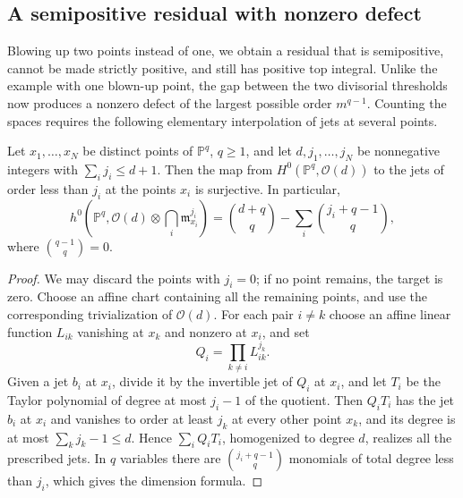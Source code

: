\subsection{A semipositive residual with nonzero defect}
\label{sec:two-point-fiber-integrability}

Blowing up two points instead of one, we obtain a residual that is semipositive, cannot be made strictly positive, and still has positive top integral. Unlike the example with one blown-up point, the gap between the two divisorial thresholds now produces a nonzero defect of the largest possible order $m^{q-1}$. Counting the spaces requires the following elementary interpolation of jets at several points.

\begin{lemma}\label{lem:finite-point-jet-interpolation}
Let $x_1,\ldots,x_N$ be distinct points of $\mathbb P^q$, $q\geq1$, and let $d,j_1,\ldots,j_N$ be nonnegative integers with $\sum_i j_i\leq d+1$. Then the map from $H^0(\mathbb P^q,\mathcal O(d))$ to the jets of order less than $j_i$ at the points $x_i$ is surjective. In particular,
\[
 h^0\left(\mathbb P^q,\mathcal O(d)\otimes\bigcap_i\mathfrak m_{x_i}^{j_i}\right)
 =\binom{d+q}{q}-\sum_i\binom{j_i+q-1}{q},
\]
where $\binom{q-1}{q}=0$.
\end{lemma}
\begin{proof}
We may discard the points with $j_i=0$; if no point remains, the target is zero. Choose an affine chart containing all the remaining points, and use the corresponding trivialization of $\mathcal O(d)$. For each pair $i\ne k$ choose an affine linear function $L_{ik}$ vanishing at $x_k$ and nonzero at $x_i$, and set
\[
 Q_i=\prod_{k\ne i}L_{ik}^{j_k}.
\]
Given a jet $b_i$ at $x_i$, divide it by the invertible jet of $Q_i$ at $x_i$, and let $T_i$ be the Taylor polynomial of degree at most $j_i-1$ of the quotient. Then $Q_iT_i$ has the jet $b_i$ at $x_i$ and vanishes to order at least $j_k$ at every other point $x_k$, and its degree is at most $\sum_kj_k-1\leq d$. Hence $\sum_iQ_iT_i$, homogenized to degree $d$, realizes all the prescribed jets. In $q$ variables there are $\binom{j_i+q-1}{q}$ monomials of total degree less than $j_i$, which gives the dimension formula.
\end{proof}

